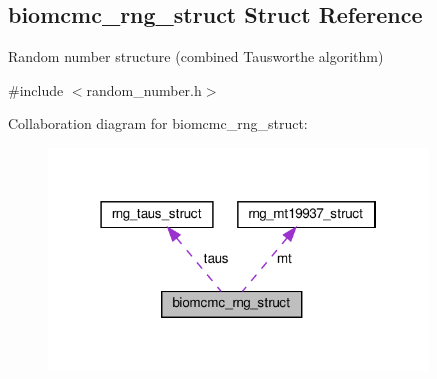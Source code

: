 \hypertarget{structbiomcmc__rng__struct}{}\subsection{biomcmc\+\_\+rng\+\_\+struct Struct Reference}
\label{structbiomcmc__rng__struct}


Random number structure (combined Tausworthe algorithm)  




{\ttfamily \#include $<$random\+\_\+number.\+h$>$}



Collaboration diagram for biomcmc\+\_\+rng\+\_\+struct\+:\nopagebreak
\begin{figure}[H]
\begin{center}
\leavevmode
\includegraphics[width=286pt]{structbiomcmc__rng__struct__coll__graph}
\end{center}
\end{figure}

